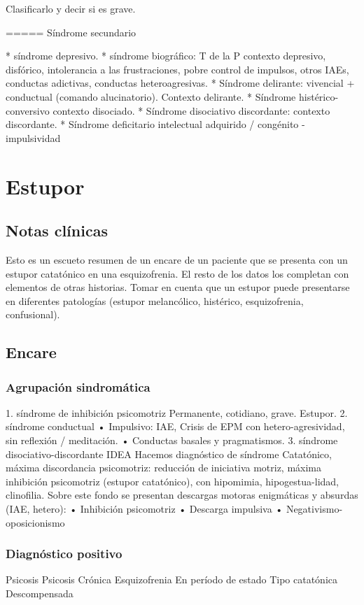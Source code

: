 \documentclass{scrbook}
\begin{document}
Clasificarlo y decir si es grave.

===== Síndrome secundario

* síndrome depresivo.
* síndrome biográfico: T de la P contexto depresivo, disfórico, intolerancia a las frustraciones, pobre control de impulsos, otros IAEs, conductas adictivas, conductas heteroagresivas.
* Síndrome delirante: vivencial + conductual (comando alucinatorio). Contexto delirante.
* Síndrome histérico-conversivo contexto disociado.
* Síndrome disociativo discordante: contexto discordante.
* Síndrome deficitario intelectual adquirido / congénito - impulsividad
\chapter*{Estupor}
\section*{Notas clínicas}
Esto es un escueto resumen de un encare de un paciente que se presenta con un estupor catatónico en una esquizofrenia. El resto de los datos los completan con elementos de otras historias. Tomar en cuenta que un estupor puede presentarse en diferentes patologías (estupor melancólico, histérico, esquizofrenia, confusional).
\section*{Encare}
\subsection*{Agrupación sindromática}

1. síndrome de inhibición psicomotriz Permanente, cotidiano, grave. Estupor.
2. síndrome conductual • Impulsivo: IAE, Crisis de EPM con hetero-agresividad, sin reflexión / meditación. • Conductas basales y pragmatismos.
3. síndrome disociativo-discordante IDEA Hacemos diagnóstico de síndrome Catatónico, máxima discordancia psicomotriz: reducción de iniciativa motriz, máxima inhibición psicomotriz (estupor catatónico), con hipomimia, hipogestua-lidad, clinofilia. Sobre este fondo se presentan descargas motoras enigmáticas y absurdas (IAE, hetero): • Inhibición psicomotriz • Descarga impulsiva • Negativismo-oposicionismo
\subsection*{Diagnóstico positivo}

Psicosis \faArrowRight Psicosis Crónica \faArrowRight Esquizofrenia \faArrowRight En período de estado \faArrowRight Tipo catatónica \faArrowRight Descompensada
\end{document}

